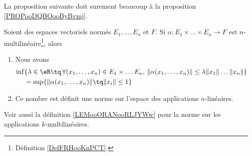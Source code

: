 La proposition suivante doit surement beaucoup à la proposition \ref{PROPooDQBOooByBvmj}.
\begin{propositionDef}	\label{DEFooTAUWooNDJJEO}
	Soient des espaces vectoriels normés \( E_1,\ldots,E_n\) et \( F\). Si \(\alpha \colon E_1\times\ldots \times E_n\to F  \) est \( n\)-multilinéaire\footnote{Définition \ref{DefFRHooKnPCT}.}, alors
	\begin{enumerate}
		\item
		      Nous avons
		      \begin{equation}
			      \begin{aligned}[]
				      \inf & \{ \lambda\in \eR\tq\,\forall (x_1,\ldots,x_n)\in E_1\times \ldots E_n,\, \| \alpha(x_1,\ldots,x_n) \|\leq \lambda \| x_1 \|\ldots\| x_n \| \} \\
				           & =\sup\{ \| \alpha(x_1,\ldots,x_n) \|\tq\| x_i \|\leq 1 \}
			      \end{aligned}
		      \end{equation}
		\item
		      Ce nombre est définit une norme sur l'espace des applications \( n\)-linéaires.
	\end{enumerate}
\end{propositionDef}

Voir aussi la définition \ref{LEMooORANooRLJYWw} pour la norme sur les applications \( k\)-multilinéaires.

